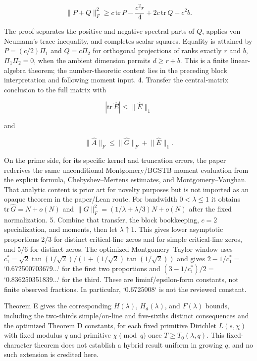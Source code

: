 \documentclass[11pt]{article}
\begin{document}
\begin{markdown}
    $$
   \lVert P+Q\rVert_F^2
   \ge c\,\mathrm{tr}\,P-\frac{c^2r}{4}
      +2c\,\mathrm{tr}\,Q-c^2b.
    $$

    The proof separates the positive and negative spectral parts of $Q$, applies von Neumann's
   trace inequality, and completes scalar squares. Equality is attained by
   $P=(c/2)\Pi_1$ and $Q=c\Pi_2$ for orthogonal projections of ranks exactly $r$ and $b$,
   $\Pi_1\Pi_2=0$, when the ambient dimension permits $d\ge r+b$. This is a finite
   linear-algebra theorem; the
   number-theoretic content lies in the preceding block interpretation and following moment input.
4. Transfer the central-matrix conclusion to the full matrix with

    $$
   |\mathrm{tr}\,\widehat E|\le\lVert\widehat E\rVert_1
    $$

    and

    $$
   \lVert\widehat A\rVert_F\le\lVert\widehat G\rVert_F+\lVert\widehat E\rVert_1.
    $$

    On the prime side, for its specific kernel
   and truncation errors, the paper rederives the same unconditional Montgomery/BGSTB moment
   evaluation from the explicit formula, Chebyshev--Mertens estimates, and Montgomery--Vaughan.
   That analytic content is prior art for novelty purposes but is not imported as an opaque theorem
   in the paper/Lean route. For bandwidth $0<\lambda\le1$ it obtains
   $\mathrm{tr}\,\widehat G=N+o(N)$ and
   $\lVert\widehat G\rVert_F^2=(1/\lambda+\lambda/3)N+o(N)$ after the fixed normalization.
5. Combine that transfer, the block bookkeeping, $c=2$ specialization, and moments, then let
   $\lambda\uparrow1$. This gives lower asymptotic proportions $2/3$ for distinct critical-line
   zeros and for simple critical-line zeros, and $5/6$ for distinct zeros. The optimized
   Montgomery--Taylor window uses
   $c_1^*=\sqrt2\tan(1/\sqrt2)/(1+(1/\sqrt2)\tan(1/\sqrt2))$ and gives
   $2-1/c_1^*=$ `0.672500703679...` for the first two proportions and
   $(3-1/c_1^*)/2=$ `0.836250351839...` for the third. These are liminf/epsilon-form constants, not
   finite observed fractions. In particular, `0.6725008` is not the reviewed constant.

Theorem E gives the corresponding $H(\lambda)$, $H_d(\lambda)$, and $F(\lambda)$ bounds, including
the two-thirds simple/on-line and five-sixths distinct consequences and the optimized Theorem D
constants, for each fixed primitive Dirichlet $L(s,\chi)$ with fixed modulus $q$ and primitive
$\chi\pmod q$ once $T\ge T_0(\lambda,q)$. This fixed-character theorem does not establish a
hybrid result uniform in growing $q$, and no such extension is credited here.


\end{markdown}
\end{document}
